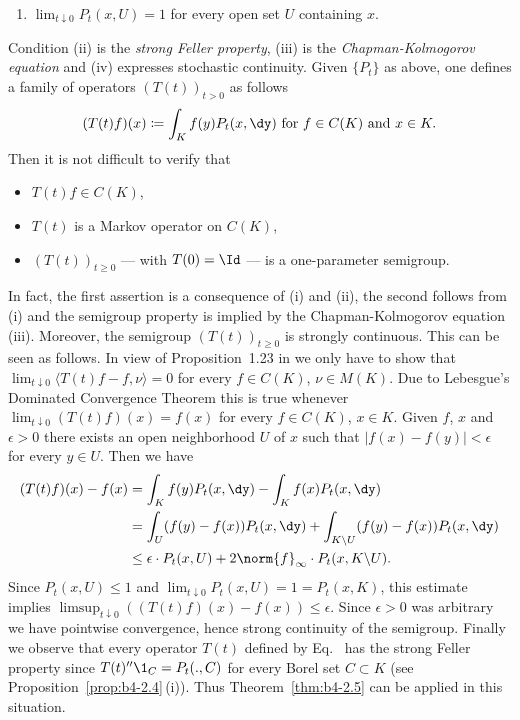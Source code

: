 \begin{example}
\begin{enumerate}[\upshape (i)]
    \item 
    $\lim_{t\downarrow0} P_t(x,U) = 1$ for every open set $U$ containing $x$.
\end{enumerate}
Condition (ii) is the \emph{strong Feller property}, (iii) is the \emph{Chapman-Kolmogorov equation} and (iv) expresses stochastic continuity.
Given $\{P_t\}$ as above, one defines a family of operators $(T(t))_{t>0}$ as follows
\begin{equation}\label{eq:b4-2.4}
    (T(t)f)(x)  \coloneq  \int_K f(y)P_t(x,\dy)  \text{ for } f \in C(K)  \text{ and } x \in K .
\end{equation}
Then it is not difficult to verify that 
\begin{itemize}[-] 
    \item 
    $T(t)f \in C(K)$, 
    \item 
    $T(t)$ is a Markov operator on $C(K)$, 
    \item 
    $(T(t))_{t \geq 0}$ --- with $T(0) = \Id $ --- is a one-parameter semigroup.
\end{itemize}
In fact, the first assertion is a consequence of (i) and (ii), the second follows from (i) and the semigroup property is implied by the Chapman-Kolmogorov equation (iii).
Moreover, the semigroup $(T(t))_{t \geq 0}$ is strongly continuous.
This can be seen as follows. 
In view of Proposition~1.23 in \textcite{davies:1980} we only have
to show that $\lim_{t\downarrow 0}\langle T(t)f-f,\nu\rangle = 0$ for every $f \in C(K)$, $\nu \in M(K)$.
Due to Lebesgue's Dominated Convergence Theorem this is true whenever
$\lim_{t\downarrow0}(T(t)f)(x) = f(x)$ for every $f \in C(K)$, $x \in K$.
Given $f$, $x$
and $\epsilon > 0$ there exists an open neighborhood $U$ of\/ $x$ such that
$|f(x) - f(y)| < \epsilon$ for every $y \in U$.
Then we have
\begin{align*} 
    (T(t)f)(x) - f(x) &= \int_K f(y)P_t(x,\dy) - \int_K f(x)P_t(x,\dy) \\
    &= \int_U (f(y)-f(x))P_t(x,\dy) + \int_{K\backslash U} (f(y)-f(x))P_t(x,\dy)  \\
    &\leq \epsilon\cdot P_t(x,U) + 2\norm{f}_{\infty}\cdot P_t(x,K\backslash U) .
\end{align*}
Since $P_t(x,U) \leq 1$ and $\lim_{t\downarrow0} P_t(x,U) = 1 = P_t(x,K)$, this estimate
implies $\limsup_{t\downarrow 0}((T(t)f)(x) - f(x)) \leq \epsilon$.
Since $\epsilon > 0$ was arbitrary we have pointwise convergence, hence strong continuity of the semigroup.
Finally we observe that every operator $T(t)$ defined by Eq.~ has the
strong Feller property since $T(t)''\1_C = P_t(.,C)$ for every Borel set
$C \subset K$ (see Proposition~\ref{prop:b4-2.4}\,(i)).
Thus Theorem~\ref{thm:b4-2.5} can be applied in this situation.
\end{example}

